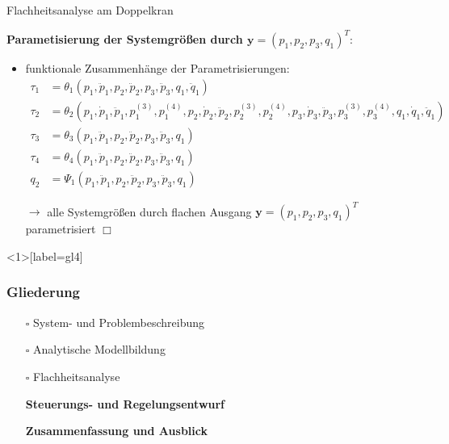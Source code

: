 \documentclass[
	ngerman,
	10pt,				%
	aspectratio=169 	%
]{beamer}
\newcommand{\cdbox}{$\square$\hspace{-0.65em}\raisebox{0.1em}{\checkmark}\hspace{-0.18em}}
\begin{document}
\begin{frame}[t,fragile,label=Flachheit_Doppelkran_2]{\large Flachheitsanalyse am Doppelkran}
	
	\textbf{Parametisierung der Systemgrößen durch $\mathbf{y} = (p_1, p_2, p_3, q_1)^T:$}
		
	\begin{itemize}
		\item funktionale Zusammenhänge der Parametrisierungen:
		\begin{align*}
			\tau_1 &= \theta_1 \left(p_1, \ddot{p}_1, p_2, \ddot{p}_2, p_3, \ddot{p}_3, q_1, \ddot{q}_1 \right) \\
			\tau_2 &= \theta_2 \left(p_1, \dot{p}_1, \ddot{p}_1, p_1^{(3)}, p_1^{(4)}, p_2, \dot{p}_2, \ddot{p}_2, p_2^{(3)}, p_2^{(4)}, p_3, \dot{p}_3, \ddot{p}_3, p_3^{(3)}, p_3^{(4)}, q_1, \dot{q}_1, \ddot{q}_1 \right) \\
			\tau_3 &= \theta_3 \left(p_1, \ddot{p}_1, p_2, \ddot{p}_2, p_3, \ddot{p}_3, q_1 \right) \\
			\tau_4 &= \theta_4 \left(p_1, \ddot{p}_1, p_2, \ddot{p}_2, p_3, \ddot{p}_3, q_1 \right) \\
			q_2 &= \Psi_1 \left(p_1, \ddot{p}_1, p_2, \ddot{p}_2, p_3, \ddot{p}_3, q_1 \right)
		\end{align*}
		\pause
		\item[$\rightarrow$] alle Systemgrößen durch flachen Ausgang $\mathbf{y} = (p_1, p_2, p_3, q_1)^T$ parametrisiert \quad $\Box$
	\end{itemize}
		
\end{frame}


\begin{frame}<1>[label=gl4]
	\frametitle{Gliederung}
	\begin{itemize}
		\item[\cdbox] System- und Problembeschreibung
		\item[\cdbox] Analytische Modellbildung
		\item[\cdbox] Flachheitsanalyse
		\item[\only<1>{$\rightarrow$}\only<2>{$\rightarrow$}\only<4->{\cdbox}]
		\textbf<1>{Steuerungs- und Regelungsentwurf}
		\item[\only<1-2>{$\square$}\only<3>{$\rightarrow$}\only<4->{\cdbox}]
		\textbf<3>{Zusammenfassung und Ausblick}
	\end{itemize}
\end{frame}
\end{document}
